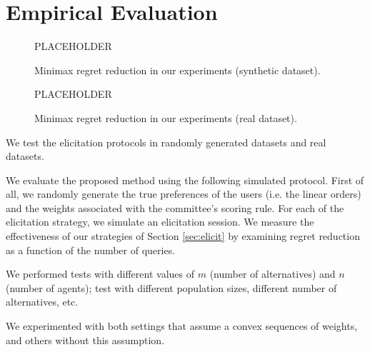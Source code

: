 \documentclass[12pt]{article}
\DeclareMathOperator{\MMR}{MMR}
\begin{document}

\section{Empirical Evaluation} \label{sec:experiments}

\begin{figure}[t]
\begin{center}PLACEHOLDER\end{center}
\vspace{3.5cm}
\caption{Minimax regret reduction in our experiments (synthetic dataset).}
\end{figure}

\begin{figure}[t]
\begin{center}PLACEHOLDER\end{center}
\vspace{3.5cm}
\caption{Minimax regret reduction in our experiments (real dataset).}
\end{figure}

We test the elicitation protocols in randomly generated datasets and real datasets. %

We evaluate the proposed method using the following simulated protocol.
First of all, we randomly generate the true preferences of the users (i.e. the linear orders) and the weights associated with the committee's scoring rule.
For each of the elicitation strategy, we simulate an elicitation session.
We measure the effectiveness of our strategies of Section \ref{sec:elicit} by examining regret reduction as a function of the number of queries.

We performed tests with different values of $m$ (number of alternatives) and $n$ (number of agents); test with different population sizes, different number of alternatives, etc.

We experimented with both settings that assume a convex sequences of weights, and others without this assumption.

\end{document}
